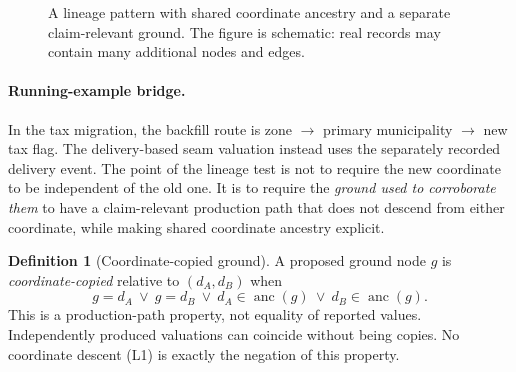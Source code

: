 \documentclass[11pt]{article}
\theoremstyle{definition}
\newtheorem{definition}{Definition}[section]
\begin{document}
\begin{figure}[htbp]
\centering
{}
\caption{A lineage pattern with shared coordinate ancestry and a separate claim-relevant ground. The figure is schematic: real records may contain many additional nodes and edges.}
\label{ex:fig:lineage-dag}
\end{figure}

\paragraph{Running-example bridge.} In the tax migration, the backfill route is zone $\to$ primary municipality $\to$ new tax flag. The delivery-based seam valuation instead uses the separately recorded delivery event. The point of the lineage test is not to require the new coordinate to be independent of the old one. It is to require the \emph{ground used to corroborate them} to have a claim-relevant production path that does not descend from either coordinate, while making shared coordinate ancestry explicit.

\begin{definition}[Coordinate-copied ground]\label{ex:def:copied-ground}
A proposed ground node $g$ is \emph{coordinate-copied} relative to $(d_A,d_B)$ when
\[
g=d_A\ \lor\ g=d_B\ \lor\ d_A\in\operatorname{anc}(g)\ \lor\ d_B\in\operatorname{anc}(g).
\]
This is a production-path property, not equality of reported values. Independently produced valuations can coincide without being copies. No coordinate descent (L1) is exactly the negation of this property.
\end{definition}
\end{document}
